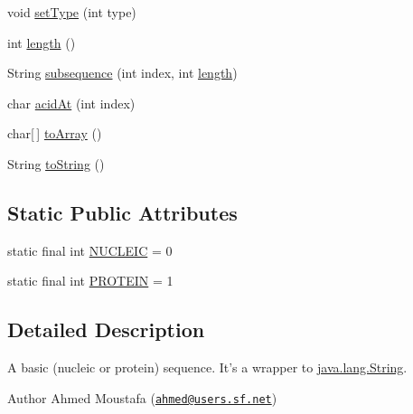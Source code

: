 \begin{DoxyCompactItemize}
\item 
void \hyperlink{classjaligner_1_1_sequence_a4ae3de6057a4f6361f3c8e930f8d6fbe}{set\+Type} (int type)
\item 
int \hyperlink{classjaligner_1_1_sequence_a5c8644682a979da36afa8ef49c5cc73a}{length} ()
\item 
String \hyperlink{classjaligner_1_1_sequence_a17bba130f9dfeace50cda783d3be1eff}{subsequence} (int index, int \hyperlink{classjaligner_1_1_sequence_a5c8644682a979da36afa8ef49c5cc73a}{length})
\item 
char \hyperlink{classjaligner_1_1_sequence_a6893ed611a81979786f5de7a93954f1f}{acid\+At} (int index)
\item 
char\mbox{[}$\,$\mbox{]} \hyperlink{classjaligner_1_1_sequence_a7f34545f2f3613b9b8e76698f2c0404b}{to\+Array} ()
\item 
String \hyperlink{classjaligner_1_1_sequence_a426db6395f22feff7c822833ad6192ec}{to\+String} ()
\end{DoxyCompactItemize}
\subsection*{Static Public Attributes}
\begin{DoxyCompactItemize}
\item 
static final int \hyperlink{classjaligner_1_1_sequence_a922c5babd0a4a1a8cf66a8605477542d}{N\+U\+C\+L\+E\+I\+C} = 0
\item 
static final int \hyperlink{classjaligner_1_1_sequence_a4cae25b7db032f8e34bcfbb1134fa7ec}{P\+R\+O\+T\+E\+I\+N} = 1
\end{DoxyCompactItemize}


\subsection{Detailed Description}
A basic (nucleic or protein) sequence. It's a wrapper to \hyperlink{}{java.\+lang.\+String}.

\begin{DoxyAuthor}{Author}
Ahmed Moustafa (\href{mailto:ahmed@users.sf.net}{\tt ahmed@users.\+sf.\+net}) 
\end{DoxyAuthor}


